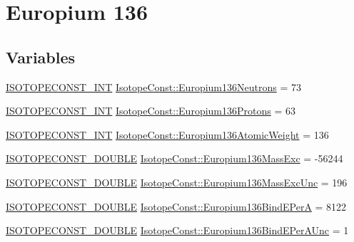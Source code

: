 \hypertarget{group___isotope_const-_europium-_eu136}{}\section{Europium 136}
\label{group___isotope_const-_europium-_eu136}
\subsection*{Variables}
\begin{DoxyCompactItemize}
\item 
\mbox{\hyperlink{group___isotope_const-_macros_ga5f18360b3e99483a35c32d789e62621c}{I\+S\+O\+T\+O\+P\+E\+C\+O\+N\+S\+T\+\_\+\+I\+NT}} \mbox{\hyperlink{group___isotope_const-_europium-_eu136_gad7c5c3682a062c5fb565e12461d1294e}{Isotope\+Const\+::\+Europium136\+Neutrons}} = 73
\item 
\mbox{\hyperlink{group___isotope_const-_macros_ga5f18360b3e99483a35c32d789e62621c}{I\+S\+O\+T\+O\+P\+E\+C\+O\+N\+S\+T\+\_\+\+I\+NT}} \mbox{\hyperlink{group___isotope_const-_europium-_eu136_ga54b68756099e2d7e80f6c418ae9d8af0}{Isotope\+Const\+::\+Europium136\+Protons}} = 63
\item 
\mbox{\hyperlink{group___isotope_const-_macros_ga5f18360b3e99483a35c32d789e62621c}{I\+S\+O\+T\+O\+P\+E\+C\+O\+N\+S\+T\+\_\+\+I\+NT}} \mbox{\hyperlink{group___isotope_const-_europium-_eu136_gab6b60dc62aead9ec25b2027eca1c45e3}{Isotope\+Const\+::\+Europium136\+Atomic\+Weight}} = 136
\item 
\mbox{\hyperlink{group___isotope_const-_macros_ga8f45a7272ce02c0b4c65c44636ed719a}{I\+S\+O\+T\+O\+P\+E\+C\+O\+N\+S\+T\+\_\+\+D\+O\+U\+B\+LE}} \mbox{\hyperlink{group___isotope_const-_europium-_eu136_ga308447fc4bf98bbee477475bf5343080}{Isotope\+Const\+::\+Europium136\+Mass\+Exc}} = -\/56244
\item 
\mbox{\hyperlink{group___isotope_const-_macros_ga8f45a7272ce02c0b4c65c44636ed719a}{I\+S\+O\+T\+O\+P\+E\+C\+O\+N\+S\+T\+\_\+\+D\+O\+U\+B\+LE}} \mbox{\hyperlink{group___isotope_const-_europium-_eu136_ga2930ee65808441d9197358a541caa65c}{Isotope\+Const\+::\+Europium136\+Mass\+Exc\+Unc}} = 196
\item 
\mbox{\hyperlink{group___isotope_const-_macros_ga8f45a7272ce02c0b4c65c44636ed719a}{I\+S\+O\+T\+O\+P\+E\+C\+O\+N\+S\+T\+\_\+\+D\+O\+U\+B\+LE}} \mbox{\hyperlink{group___isotope_const-_europium-_eu136_ga3cc269f6b724daa4601eac8b52dcfcba}{Isotope\+Const\+::\+Europium136\+Bind\+E\+PerA}} = 8122
\item 
\mbox{\hyperlink{group___isotope_const-_macros_ga8f45a7272ce02c0b4c65c44636ed719a}{I\+S\+O\+T\+O\+P\+E\+C\+O\+N\+S\+T\+\_\+\+D\+O\+U\+B\+LE}} \mbox{\hyperlink{group___isotope_const-_europium-_eu136_gaf2ebfebc94dbc5ebfe7b82ec2cfedcaa}{Isotope\+Const\+::\+Europium136\+Bind\+E\+Per\+A\+Unc}} = 1

\end{DoxyCompactItemize}
